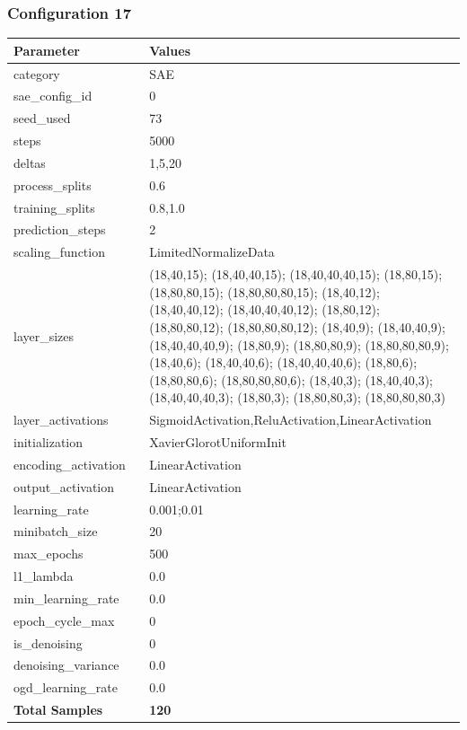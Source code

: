 \documentclass[a4paper,11pt,oneside]{article}
\theoremstyle{plain}
\theoremstyle{definition}
\begin{document}
	\newpage
	\subsubsection{Configuration 17}\label{config17}
	\begin{longtable}[H]{|p{0.3\linewidth}|p{0.7\linewidth}|} \hline 			\rowcolor{beaublue}\textbf{Parameter} &\textbf{Values} \\\hline{category} & {SAE} \\\hline
		{sae\_config\_id} & {0} \\\hline
		{seed\_used} & {73} \\\hline
		{steps} & {5000} \\\hline
		{deltas} & {1,5,20} \\\hline
		{process\_splits} & {0.6} \\\hline
		{training\_splits} & {0.8,1.0} \\\hline
		{prediction\_steps} & {2} \\\hline
		{scaling\_function} & {LimitedNormalizeData} \\\hline
		{layer\_sizes} & {(18,40,15); (18,40,40,15); (18,40,40,40,15); (18,80,15); (18,80,80,15); (18,80,80,80,15); (18,40,12); (18,40,40,12); (18,40,40,40,12); (18,80,12); (18,80,80,12); (18,80,80,80,12); (18,40,9); (18,40,40,9); (18,40,40,40,9); (18,80,9); (18,80,80,9); (18,80,80,80,9); (18,40,6); (18,40,40,6); (18,40,40,40,6); (18,80,6); (18,80,80,6); (18,80,80,80,6); (18,40,3); (18,40,40,3); (18,40,40,40,3); (18,80,3); (18,80,80,3); (18,80,80,80,3)} \\\hline
		{layer\_activations} & {SigmoidActivation,ReluActivation,LinearActivation} \\\hline
		{initialization} & {XavierGlorotUniformInit} \\\hline
		{encoding\_activation} & {LinearActivation} \\\hline
		{output\_activation} & {LinearActivation} \\\hline
		{learning\_rate} & {0.001;0.01} \\\hline
		{minibatch\_size} & {20} \\\hline
		{max\_epochs} & {500} \\\hline
		{l1\_lambda} & {0.0} \\\hline
		{min\_learning\_rate} & {0.0} \\\hline
		{epoch\_cycle\_max} & {0} \\\hline
		{is\_denoising} & {0} \\\hline
		{denoising\_variance} & {0.0} \\\hline
		{ogd\_learning\_rate} & {0.0} \\\hline
		{\textbf{Total Samples}} & {\textbf{120}} \\\hline
	\end{longtable}
	
\end{document}
